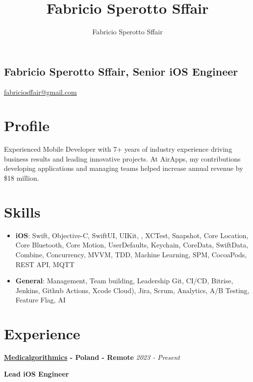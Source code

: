 \documentclass[11pt, oneside]{article}
\title{Fabricio Sperotto Sffair}
\author{Fabricio Sperotto Sffair}
\begin{document}
\begin{center}
    \section*{Fabricio Sperotto Sffair, Senior iOS Engineer}
    
    \href{https://www.linkedin.com/in/fabriciosffair/}{\faLinkedin \quad} \href{https://github.com/fabriciosffair}{\faGithub \quad}
    \href{mailto:fabriciosffair@gmail.com}{fabriciosffair@gmail.com}
\end{center}

\section*{Profile}

Experienced Mobile Developer with 7+ years of industry experience driving business results and leading innovative projects. At AirApps, my contributions developing applications and managing teams helped increase annual revenue by \$18 million.

\section*{Skills}

\begin{itemize}
    \item \textbf{iOS}: Swift, Objective-C, SwiftUI, UIKit, , XCTest, Snapshot, Core Location, Core Bluetooth, Core Motion, UserDefaults, Keychain, CoreData, SwiftData, Combine, Concurrency, MVVM, TDD, Machine Learning, SPM, CocoaPods, REST API, MQTT
    \item \textbf{General}:  Management, Team building, Leadership Git, CI/CD, Bitrise, Jenkins, Github Actions, Xcode Cloud), Jira, Scrum, Analytics, A/B Testing, Feature Flag, AI
\end{itemize}

\section*{Experience}

\textbf{\href{https://www.medicalgorithmics.com}{Medicalgorithmics} - Poland - Remote}
\hfill
\textit{2023 - Present}

\textbf{Lead iOS Engineer}
\end{document}
